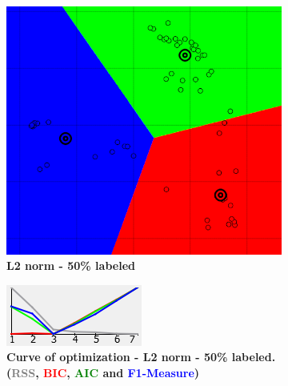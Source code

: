 \begin{figure}[h]
\centering
	\begin{subfigure}[h]{0.25\textwidth}
    \centering
	\includegraphics[height=0.15\textheight]{./clustering/opt_F1_50__k_mean_L2_range7.png}
	\caption{\bf L2 norm - 50\% labeled}
    \label{fig:figure11a}
	\end{subfigure}
    \hspace{20mm}
	\begin{subfigure}[h]{0.50\textwidth}
    \centering
	\includegraphics[height=0.15\textheight]{./clustering/curve_opt_F1_50__k_mean_L2_range7.png}
	\caption{\bf Curve of optimization - L2 norm - 50\% labeled. (\textcolor{gray}{RSS}, \textcolor{red}{BIC}, \textcolor{green}{AIC} and \textcolor{blue}{F1-Measure})}
    \label{fig:figur11c}
	\end{subfigure}\\ 
    \begin{subfigure}[h]{0.25\textwidth}
    \centering

\end{subfigure}
\end{figure}
